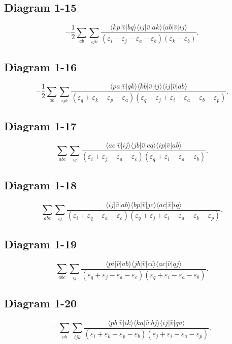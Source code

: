 \documentclass[aps,preprint,amsmath,amssymb]{revtex4-1}
\begin{document}
\subsection*{Diagram 1-15}
\[
-\frac{1}{2}\sum_{ab}\sum_{ijk}\frac{\langle kp| \hat{v} |bq  \rangle \langle ij| \hat{v} |ak  \rangle \langle ab| \hat{v} |ij  \rangle }{(\varepsilon_i+\varepsilon_j-\varepsilon_a-\varepsilon_b) (\varepsilon_k-\varepsilon_b)}.
\]

\subsection*{Diagram 1-16}
\[
-\frac{1}{2}\sum_{ab}\sum_{ijk}\frac{\langle pa| \hat{v} |qk  \rangle \langle kb| \hat{v} |ij  \rangle \langle ij| \hat{v} |ab  \rangle }{(\varepsilon_q+\varepsilon_k-\varepsilon_p-\varepsilon_a) (\varepsilon_q+\varepsilon_j+\varepsilon_i-\varepsilon_a-\varepsilon_b-\varepsilon_p)}.
\]

\subsection*{Diagram 1-17}
\[
\sum_{abc}\sum_{ij}\frac{\langle ac| \hat{v} |ij  \rangle \langle jb| \hat{v} |cq  \rangle \langle ip| \hat{v} |ab \rangle }{(\varepsilon_i+\varepsilon_j-\varepsilon_a-\varepsilon_c) (\varepsilon_q+\varepsilon_i-\varepsilon_a-\varepsilon_b)}.
\]

\subsection*{Diagram 1-18}
\[
\sum_{abc}\sum_{ij}\frac{\langle ij| \hat{v}| ab  \rangle \langle bp| \hat{v} |jc  \rangle \langle ac| \hat{v} |iq  \rangle }{(\varepsilon_i+\varepsilon_q-\varepsilon_a-\varepsilon_c) (\varepsilon_q+\varepsilon_j+\varepsilon_i-\varepsilon_a-\varepsilon_b-\varepsilon_p)}.
\]

\subsection*{Diagram 1-19}
\[
\sum_{abc}\sum_{ij}\frac{\langle pi| \hat{v} |ab  \rangle \langle jb| \hat{v} |ci  \rangle \langle ac| \hat{v} |qj  \rangle }{(\varepsilon_q+\varepsilon_j-\varepsilon_a-\varepsilon_c) (\varepsilon_q+\varepsilon_i-\varepsilon_a-\varepsilon_b)}.
\]


\subsection*{Diagram 1-20}
\[
-\sum_{ab}\sum_{ijk}\frac{\langle pb| \hat{v} |ik  \rangle \langle ka| \hat{v} |bj  \rangle \langle ij| \hat{v} |qa  \rangle }{(\varepsilon_i+\varepsilon_k-\varepsilon_p-\varepsilon_b) (\varepsilon_j+\varepsilon_i-\varepsilon_a-\varepsilon_p)}.
\]
\end{document}
